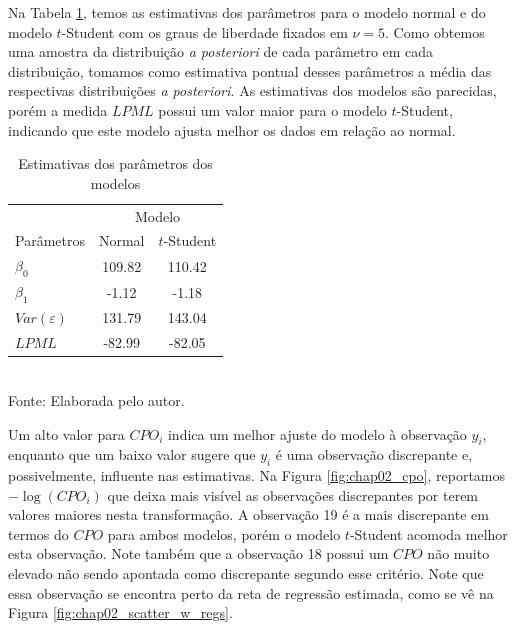 Na Tabela \ref{tab:chap02_estimatives}, temos as estimativas dos parâmetros para o modelo normal e do modelo $t$-Student com os graus de liberdade fixados em $\nu=5$. Como obtemos uma amostra da distribuição \textit{a posteriori} de cada parâmetro em cada distribuição, tomamos como estimativa pontual desses parâmetros a média das respectivas distribuições \textit{a posteriori}. As estimativas dos modelos são parecidas, porém a medida $LPML$ possui um valor maior para o modelo $t$-Student, indicando que este modelo ajusta melhor os dados em relação ao normal.

\begin{table}[h]
\centering
\caption{Estimativas dos parâmetros dos modelos}
\label{tab:chap02_estimatives}
\begin{tabular}{l|cc}
                   & \multicolumn{2}{c}{Modelo}                \\ \cline{2-3} 
Parâmetros         & \multicolumn{1}{c|}{Normal} & $t$-Student \\ \hline 
$\beta_0$          & \multicolumn{1}{c|}{109.82} & 110.42      \\
$\beta_1$          & \multicolumn{1}{c|}{-1.12}  & -1.18       \\
$Var(\varepsilon)$ & \multicolumn{1}{c|}{131.79} & 143.04      \\
$LPML$             & \multicolumn{1}{c|}{-82.99} & -82.05      \\ \hline
\end{tabular}
\\ Fonte: Elaborada pelo autor.
\end{table}

Um alto valor para $CPO_i$ indica um melhor ajuste do modelo à observação $y_i$, enquanto que um baixo valor sugere que $y_i$ é uma observação discrepante e, possivelmente, influente nas estimativas. Na Figura \ref{fig:chap02_cpo}, reportamos $-\log(CPO_i)$ que deixa mais visível as observações discrepantes por terem valores maiores nesta transformação. A observação 19 é a mais discrepante em termos do $CPO$ para ambos modelos, porém o modelo $t$-Student acomoda melhor esta observação. Note também que a observação 18 possui um $CPO$ não muito elevado não sendo apontada como discrepante segundo esse critério. Note que essa observação se encontra perto da reta de regressão estimada, como se vê na Figura \ref{fig:chap02_scatter_w_regs}.

